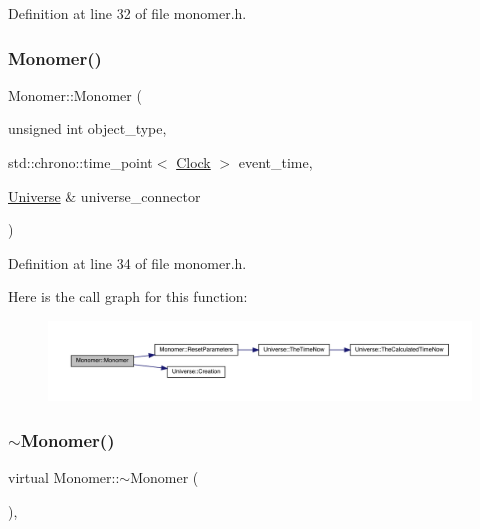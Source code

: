 Definition at line 32 of file monomer.\+h.

\mbox{\label{class_monomer_ae2b80466a0e724125aee173df34d1a6c}} 
\subsubsection{\texorpdfstring{Monomer()}{Monomer()}\hspace{0.1cm}{\footnotesize\ttfamily [4/4]}}
{\footnotesize\ttfamily Monomer\+::\+Monomer (\begin{DoxyParamCaption}\item[{unsigned int}]{object\+\_\+type,  }\item[{std\+::chrono\+::time\+\_\+point$<$ \mbox{\hyperlink{universe_8h_a0ef8d951d1ca5ab3cfaf7ab4c7a6fd80}{Clock}} $>$}]{event\+\_\+time,  }\item[{\mbox{\hyperlink{class_universe}{Universe}} \&}]{universe\+\_\+connector }\end{DoxyParamCaption})\hspace{0.3cm}{\ttfamily [inline]}}



Definition at line 34 of file monomer.\+h.

Here is the call graph for this function\+:\nopagebreak
\begin{figure}[H]
\begin{center}
\leavevmode
\includegraphics[width=350pt]{class_monomer_ae2b80466a0e724125aee173df34d1a6c_cgraph}
\end{center}
\end{figure}
\mbox{\label{class_monomer_a802bf239fc55d16783736393edbd6899}} 
\subsubsection{\texorpdfstring{$\sim$\+Monomer()}{~Monomer()}}
{\footnotesize\ttfamily virtual Monomer\+::$\sim$\+Monomer (\begin{DoxyParamCaption}{ }\end{DoxyParamCaption})\hspace{0.3cm}{\ttfamily [inline]}, {\ttfamily [virtual]}}

